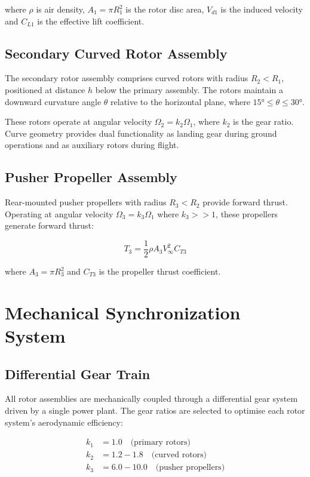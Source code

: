 \documentclass[12pt,a4paper]{article}
\begin{document}
where $\rho$ is air density, $A_1 = \pi R_1^2$ is the rotor disc area, $V_{d1}$ is the induced velocity and $C_{L1}$ is the effective lift coefficient.

\subsection{Secondary Curved Rotor Assembly}

The secondary rotor assembly comprises curved rotors with radius $R_2 < R_1$, positioned at distance $h$ below the primary assembly. The rotors maintain a downward curvature angle $\theta$ relative to the horizontal plane, where $15° \leq \theta \leq 30°$.

These rotors operate at angular velocity $\Omega_2 = k_2 \Omega_1$, where $k_2$ is the gear ratio. Curve geometry provides dual functionality as landing gear during ground operations and as auxiliary rotors during flight.

\subsection{Pusher Propeller Assembly}

Rear-mounted pusher propellers with radius $R_3 < R_2$ provide forward thrust. Operating at angular velocity $\Omega_3 = k_3 \Omega_1$ where $k_3 >> 1$, these propellers generate forward thrust:

\begin{equation}
T_3 = \frac{1}{2}\rho A_3 V_\infty^2 C_{T3}
\end{equation}

where $A_3 = \pi R_3^2$ and $C_{T3}$ is the propeller thrust coefficient.

\section{Mechanical Synchronization System}

\subsection{Differential Gear Train}

All rotor assemblies are mechanically coupled through a differential gear system driven by a single power plant. The gear ratios are selected to optimise each rotor system's aerodynamic efficiency:

\begin{align}
k_1 &= 1.0 \quad \text{(primary rotors)} \\
k_2 &= 1.2-1.8 \quad \text{(curved rotors)} \\
k_3 &= 6.0-10.0 \quad \text{(pusher propellers)}
\end{align}
\end{document}
